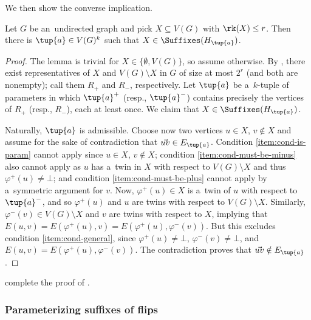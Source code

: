 We then show the converse implication.

\begin{lemma}
    \label{lem:low-rank-to-suffixes-ltr}
    Let $G$ be an~undirected graph and pick $X \subseteq V(G)$ with $\rk(X) \leq r$.
    Then there is $\tup{a} \in V(G)^k$ such that $X \in \Suffixes(H_{\tup{a}})$.
\end{lemma}
\begin{proof}
    The lemma is trivial for $X \in \{\emptyset, V(G)\}$, so assume otherwise.
    By , there exist representatives of $X$ and $V(G) \setminus X$ in $G$ of size at most $2^r$ (and both are nonempty); call them $R_+$ and $R_-$, respectively.
    Let $\tup{a}$ be a~$k$-tuple of parameters in which $\tup{a}^+$ (resp., $\tup{a}^-$) contains precisely the vertices of $R_+$ (resp., $R_-$), each at least once.
    We claim that $X \in \Suffixes(H_{\tup{a}})$.

    Naturally, $\tup{a}$ is admissible.
    Choose now two vertices $u \in X$, $v \notin X$ and assume for the sake of contradiction that $\vec{uv} \in E_{\tup{a}}$.
    Condition \ref{item:cond-is-param} cannot apply since $u \in X$, $v \notin X$; condition \ref{item:cond-must-be-minus} also cannot apply as $u$ has a~twin in $X$ with respect to $V(G) \setminus X$ and thus $\varphi^+(u) \neq \bot$; and condition \ref{item:cond-must-be-plus} cannot apply by a~symmetric argument for $v$.
    Now, $\varphi^+(u) \in X$ is a~twin of $u$ with respect to $\tup{a}^-$, and so $\varphi^+(u)$ and $u$ are twins with respect to $V(G) \setminus X$.
    Similarly, $\varphi^-(v) \in V(G) \setminus X$ and $v$ are twins with respect to $X$, implying that $E(u, v) = E(\varphi^+(u), v) = E(\varphi^+(u), \varphi^-(v))$.
    But this excludes condition \ref{item:cond-general}, since $\varphi^+(u) \neq \bot$, $\varphi^-(v) \neq \bot$, and $E(u, v) = E(\varphi^+(u), \varphi^-(v))$.
    The contradiction proves that $\vec{uv} \notin E_{\tup{a}}$.
\end{proof}

 complete the proof of .



\subsubsection{Parameterizing suffixes of flips}

